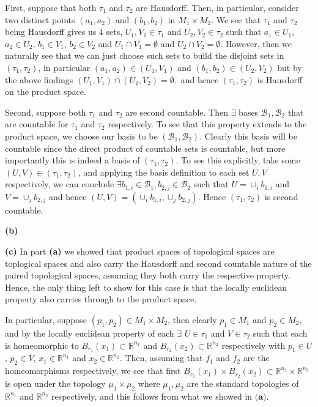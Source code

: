 \documentclass[10pt]{article}
\newcommand{\R}{\mathbb{R}}
\begin{document}
First, suppose that both $\tau_{1}$ and $\tau_{2}$ are Hausdorff. Then, in particular, consider two distinct points $(a_{1},a_{2})$ and $(b_{1},b_{2})$ in $M_{1} \times M_{2}$. We see that $\tau_{1}$ and $\tau_{2}$ being Hausdorff gives us 4 sets, $U_{1},V_{1} \in \tau_{1}$ and $U_{2},V_{2}\in \tau_{2}$ such that $a_{1}\in U_{1}$, $a_{2} \in U_{2}$, $b_{1} \in V_{1}$, $b_{2} \in V_{2}$ and $U_{1}\cap V_{1} = \emptyset$ and $U_{2}\cap V_{2} = \emptyset$. However, then we naturally see that we can just choose such sets to build the disjoint sets in $(\tau_{1},\tau_{2})$, in particular $(a_{1},a_{2}) \in (U_{1},V_{1})$ and $(b_{1},b_{2}) \in (U_{2}, V_{2})$ but by the above findings $(U_{1},V_{1}) \cap (U_{2}, V_{2}) = \emptyset$.\, and hence $(\tau_{1},\tau_{2})$ is Hausdorff on the product space.

Second, suppose both $\tau_{1}$ and $\tau_{2}$ are second countable. Then $\exists$ bases $\mathcal{B}_{1},\mathcal{B}_{2}$ that are countable for $\tau_{1}$ and $\tau_{2}$ respectively. To see that this property extends to the product space, we choose our basis to be $(\mathcal{B}_{1},\mathcal{B}_{2})$. Clearly this basis will be countable since the direct product of countable sets is countable, but more importantly this is indeed a basis of $(\tau_{1},\tau_{2})$. To see this explicitly, take some $(U,V)\in (\tau_{1},\tau_{2})$, and applying the basis definition to each set $U,V$ respectively, we can conclude $\exists b_{1,i}\in \mathcal{B}_{1},b_{2,j}\in\mathcal{B}_{2}$ such that $U = \cup_{i}b_{1,i}$ and $V = \cup_{j}b_{2,j}$ and hence $(U,V) = (\cup_{i}b_{1,i},\cup_{j}b_{2,j})$. Hence $(\tau_{1},\tau_{2})$ is second countable.

\textbf{(b)} 

\textbf{(c)} In part \textbf{(a)} we showed that product spaces of topological spaces are toplogical spaces and also carry the Hausdorff and second countable nature of the paired topological spaces, assuming they both carry the respective property. Hence, the only thing left to show for this case is that the locally euclidean property also carries through to the product space.

In particular, suppose $(p_{1},p_{2})\in M_{1}\times M_{2}$, then clearly $p_{1}\in M_{1}$ and $p_{2}\in M_{2}$, and by the locally euclidean property of each $\exists$ $U\in \tau_{1}$ and $V\in \tau_{2}$ such that each is homeomorphic to $B_{r_{1}}(x_{1}) \subset \R^{n_{1}}$ and $B_{r_{2}}(x_{2}) \subset \R^{n_{2}}$ respectively with $p_{1}\in U$, $p_{2} \in V$, $x_{1} \in \R^{n_{1}}$ and $x_{2}\in \R^{n_{2}}$. Then, assuming that $f_{1}$ and $f_{2}$ are the homeomorphisms respectively, we see that first $B_{r_{1}}(x_{1})\times B_{r_{2}}(x_{2})\subset \R^{n_{1}}\times \R^{n_{2}}$ is open under the topology $\mu_{1}\times\mu_{2}$ where $\mu_{1},\mu_{2}$ are the standard topologies of $\R^{n_{1}}$ and $\R^{n_{2}}$ respectively, and this follows from what we showed in $\textbf{(a)}$.
\end{document}
